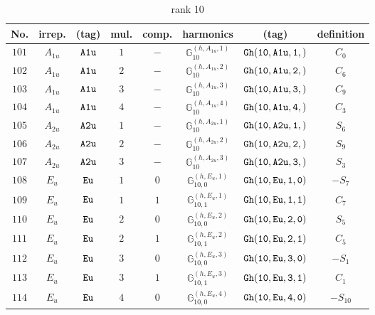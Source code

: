 \documentclass[fleqn,8pt]{jsarticle}
\begin{document}
\begin{table}[ht!]
\begin{center}
\caption{rank 10}
\renewcommand{\arraystretch}{1.3}
\begin{tabular}{cccccccc} \hline \hline
No. & irrep. & (tag) & mul. & comp. & harmonics & (tag) & definition \\ \hline
$ 101 $ & $ A_{1u} $ & $ {\tt A1u} $ & $ 1 $ & $ - $ & $ \mathbb{G}_{10}^{(h,A_{1u},1)} $ & $ {\tt Gh(10,A1u,1,)} $ & $ C_{0} $ \\
$ 102 $ & $ A_{1u} $ & $ {\tt A1u} $ & $ 2 $ & $ - $ & $ \mathbb{G}_{10}^{(h,A_{1u},2)} $ & $ {\tt Gh(10,A1u,2,)} $ & $ C_{6} $ \\
$ 103 $ & $ A_{1u} $ & $ {\tt A1u} $ & $ 3 $ & $ - $ & $ \mathbb{G}_{10}^{(h,A_{1u},3)} $ & $ {\tt Gh(10,A1u,3,)} $ & $ C_{9} $ \\
$ 104 $ & $ A_{1u} $ & $ {\tt A1u} $ & $ 4 $ & $ - $ & $ \mathbb{G}_{10}^{(h,A_{1u},4)} $ & $ {\tt Gh(10,A1u,4,)} $ & $ C_{3} $ \\
$ 105 $ & $ A_{2u} $ & $ {\tt A2u} $ & $ 1 $ & $ - $ & $ \mathbb{G}_{10}^{(h,A_{2u},1)} $ & $ {\tt Gh(10,A2u,1,)} $ & $ S_{6} $ \\
$ 106 $ & $ A_{2u} $ & $ {\tt A2u} $ & $ 2 $ & $ - $ & $ \mathbb{G}_{10}^{(h,A_{2u},2)} $ & $ {\tt Gh(10,A2u,2,)} $ & $ S_{9} $ \\
$ 107 $ & $ A_{2u} $ & $ {\tt A2u} $ & $ 3 $ & $ - $ & $ \mathbb{G}_{10}^{(h,A_{2u},3)} $ & $ {\tt Gh(10,A2u,3,)} $ & $ S_{3} $ \\
$ 108 $ & $ E_{u} $ & $ {\tt Eu} $ & $ 1 $ & $ 0 $ & $ \mathbb{G}_{10,0}^{(h,E_{u},1)} $ & $ {\tt Gh(10,Eu,1,0)} $ & $ - S_{7} $ \\
$ 109 $ & $ E_{u} $ & $ {\tt Eu} $ & $ 1 $ & $ 1 $ & $ \mathbb{G}_{10,1}^{(h,E_{u},1)} $ & $ {\tt Gh(10,Eu,1,1)} $ & $ C_{7} $ \\
$ 110 $ & $ E_{u} $ & $ {\tt Eu} $ & $ 2 $ & $ 0 $ & $ \mathbb{G}_{10,0}^{(h,E_{u},2)} $ & $ {\tt Gh(10,Eu,2,0)} $ & $ S_{5} $ \\
$ 111 $ & $ E_{u} $ & $ {\tt Eu} $ & $ 2 $ & $ 1 $ & $ \mathbb{G}_{10,1}^{(h,E_{u},2)} $ & $ {\tt Gh(10,Eu,2,1)} $ & $ C_{5} $ \\
$ 112 $ & $ E_{u} $ & $ {\tt Eu} $ & $ 3 $ & $ 0 $ & $ \mathbb{G}_{10,0}^{(h,E_{u},3)} $ & $ {\tt Gh(10,Eu,3,0)} $ & $ - S_{1} $ \\
$ 113 $ & $ E_{u} $ & $ {\tt Eu} $ & $ 3 $ & $ 1 $ & $ \mathbb{G}_{10,1}^{(h,E_{u},3)} $ & $ {\tt Gh(10,Eu,3,1)} $ & $ C_{1} $ \\
$ 114 $ & $ E_{u} $ & $ {\tt Eu} $ & $ 4 $ & $ 0 $ & $ \mathbb{G}_{10,0}^{(h,E_{u},4)} $ & $ {\tt Gh(10,Eu,4,0)} $ & $ - S_{10} $ \\

\end{tabular}
\end{center}
\end{table}
\end{document}
